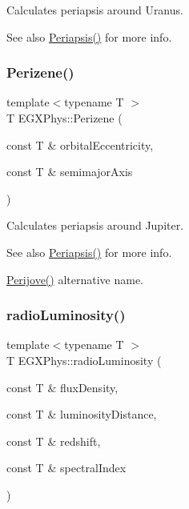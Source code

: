 Calculates periapsis around Uranus. 

\begin{DoxySeeAlso}{See also}
\hyperlink{group___astrophysics_ga4414ac75539371ec874a3d25cad6c9fe}{Periapsis()} for more info. 
\end{DoxySeeAlso}
\mbox{\label{group___astrophysics_ga0523c65b7fc26e675388b2c3d38aa00b}} 
\subsubsection{\texorpdfstring{Perizene()}{Perizene()}}
{\footnotesize\ttfamily template$<$typename T $>$ \\
T E\+G\+X\+Phys\+::\+Perizene (\begin{DoxyParamCaption}\item[{const T \&}]{orbital\+Eccentricity,  }\item[{const T \&}]{semimajor\+Axis }\end{DoxyParamCaption})}



Calculates periapsis around Jupiter. 

\begin{DoxySeeAlso}{See also}
\hyperlink{group___astrophysics_ga4414ac75539371ec874a3d25cad6c9fe}{Periapsis()} for more info. 

\hyperlink{group___astrophysics_ga075052f7ff9aa1d5fdf4501b493be86b}{Perijove()} alternative name. 
\end{DoxySeeAlso}
\mbox{\label{group___astrophysics_ga6d6865b2aac1bc7c7f06b7c4ac2444e4}} 
\subsubsection{\texorpdfstring{radio\+Luminosity()}{radioLuminosity()}}
{\footnotesize\ttfamily template$<$typename T $>$ \\
T E\+G\+X\+Phys\+::radio\+Luminosity (\begin{DoxyParamCaption}\item[{const T \&}]{flux\+Density,  }\item[{const T \&}]{luminosity\+Distance,  }\item[{const T \&}]{redshift,  }\item[{const T \&}]{spectral\+Index }\end{DoxyParamCaption})}



